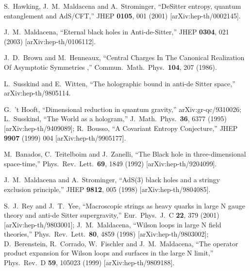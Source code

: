 \documentclass[amsmath,amssymb,nofootinbib,eqsecnum,tighten,prd,12pt]{revtex4}
\begin{document}
\begin{thebibliography}{99}

 S.~Hawking, J.~M.~Maldacena and A.~Strominger,
  ``DeSitter entropy, quantum entanglement and AdS/CFT,''
  JHEP {\bf 0105}, 001 (2001)
  [arXiv:hep-th/0002145].

J.~M.~Maldacena,
  ``Eternal black holes in Anti-de-Sitter,''
JHEP {\bf 0304}, 021 (2003)
  [arXiv:hep-th/0106112].

  J.~D.~Brown and M.~Henneaux,
  ``Central Charges In The Canonical Realization Of Asymptotic Symmetries
  ,''
  Commun.\ Math.\ Phys.\  {\bf 104}, 207 (1986).


L.~Susskind and E.~Witten,
  ``The holographic bound in anti-de Sitter space,''
  arXiv:hep-th/9805114.

G.~'t Hooft,
  ``Dimensional reduction in quantum gravity,''
  arXiv:gr-qc/9310026;
L.~Susskind,
  ``The World as a hologram,''
  J.\ Math.\ Phys.\  {\bf 36}, 6377 (1995)
  [arXiv:hep-th/9409089];
R.~Bousso,
  ``A Covariant Entropy Conjecture,''
  JHEP {\bf 9907} (1999) 004
  [arXiv:hep-th/9905177].



 M.~Banados, C.~Teitelboim and J.~Zanelli,
  ``The Black hole in three-dimensional space-time,''
  Phys.\ Rev.\ Lett.\  {\bf 69}, 1849 (1992)
  [arXiv:hep-th/9204099].


J.~M.~Maldacena and A.~Strominger,
``AdS(3) black holes and a stringy exclusion principle,''
JHEP {\bf 9812}, 005 (1998)
 [arXiv:hep-th/9804085].


S.~J.~Rey and J.~T.~Yee,
  ``Macroscopic strings as heavy quarks in large N gauge theory and  anti-de
  Sitter supergravity,''
  Eur.\ Phys.\ J.\ C {\bf 22}, 379 (2001)
  [arXiv:hep-th/9803001];
J.~M.~Maldacena,
  ``Wilson loops in large N field theories,''
  Phys.\ Rev.\ Lett.\  {\bf 80}, 4859 (1998)
  [arXiv:hep-th/9803002];
 D.~Berenstein, R.~Corrado, W.~Fischler and J.~M.~Maldacena,
  ``The operator product expansion for Wilson loops and surfaces in the  large
  N limit,''
  Phys.\ Rev.\ D {\bf 59}, 105023 (1999)  [arXiv:hep-th/9809188].





\end{thebibliography}
\end{document}
